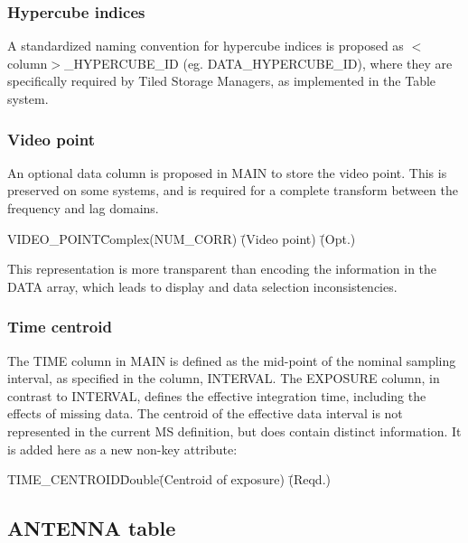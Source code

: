 \documentclass{article}
\begin{document}
\subsubsection{Hypercube indices}

A standardized naming convention for hypercube indices is proposed as
$<$column$>$\_HYPERCUBE\_ID (eg. DATA\_HYPERCUBE\_ID), where they are
specifically required by Tiled Storage Managers, as implemented in the
Table system.

\subsubsection{Video point}

 An optional data column is proposed in MAIN to store the video
point. This is preserved on some systems, and is required for a
complete transform between the frequency and lag domains. 

\begin{tabbing} 
VIDEO\_POINT\quad\quad \= Complex(NUM\_CORR)\quad\quad 
\= (Video point) \quad\quad \= (Opt.) \\
\end{tabbing}

 This representation is more transparent than encoding the information
in the DATA array, which leads to display and data selection
inconsistencies.

\subsubsection{Time centroid}

The TIME column in MAIN is defined as the mid-point of the nominal
sampling interval, as specified in the column, INTERVAL. The EXPOSURE
column, in contrast to INTERVAL, defines the effective integration
time, including the effects of missing data. The centroid of the
effective data interval is not represented in the current MS
definition, but does contain distinct information. It is added here as
a new non-key attribute:

\begin{tabbing}
TIME\_CENTROID\quad\quad \= Double\quad\quad \= (Centroid of
exposure) \quad\quad \= (Reqd.) \\
\end{tabbing}

\subsection{ANTENNA table}
\end{document}
